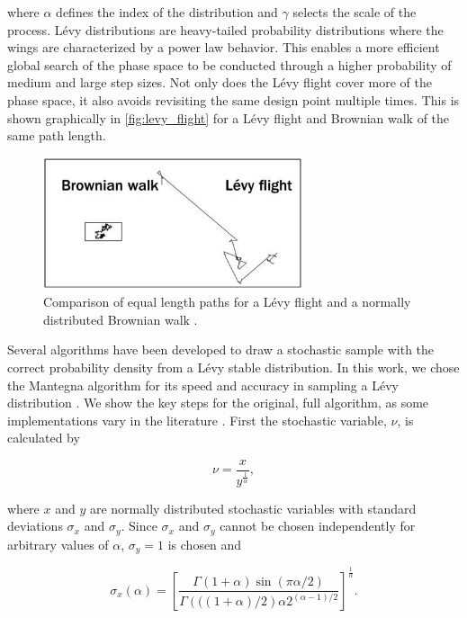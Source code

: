 \documentclass{article}                                                                           %
\begin{document}
\noindent where $\alpha$ defines the index of the distribution and $\gamma$ selects the scale of the process. 
Lévy distributions are heavy-tailed probability distributions where the wings are characterized by a power law behavior.   
This enables a more efficient global search of the phase space to be conducted through a higher probability of medium and large step sizes. 
Not only does the Lévy flight cover more of the phase space, it also avoids revisiting the same design point multiple times.  
This is shown graphically in \autoref{fig:levy_flight} for a Lévy flight and Brownian walk of the same path length.  
       
\begin{figure}[!t]
  \centering
  \includegraphics[width=3.0in]{Levy_Brownian.jpg}
  \caption{Comparison of equal length paths for a Lévy flight and a normally distributed Brownian walk \cite{Witze2010}.}
  \label{fig:levy_flight}
\end{figure}

Several algorithms have been developed to draw a stochastic sample with the correct probability density from a Lévy stable distribution.
In this work, we chose the Mantegna algorithm for its speed and accuracy in sampling a Lévy distribution \cite{Pantaleo2009, Levy1994}.
We show the key steps for the original, full algorithm, as some implementations vary in the literature \cite{Levy1994, Yang2009}.  
First the stochastic variable, $\nu$, is calculated by 

\begin{equation} \label{eq:Levy_1}
  \nu=\frac{x}{y^{\frac{1}{\alpha}}},
\end{equation}

\noindent where $x$ and $y$ are normally distributed stochastic variables with standard deviations $\sigma_x$ and $\sigma_y$.
Since $\sigma_x$ and $\sigma_y$  cannot be chosen independently for arbitrary values of $\alpha$, $\sigma_y=1$ is chosen and 

\begin{equation}
  \sigma_x(\alpha)=\left[ \frac{\Gamma(1+\alpha)\sin(\pi \alpha/2)}{\Gamma \left( ((1+\alpha)/2 \right)\alpha2^{(\alpha-1)/2}} \right]^{\frac{1}{\alpha}}.
\end{equation}  
\end{document}
